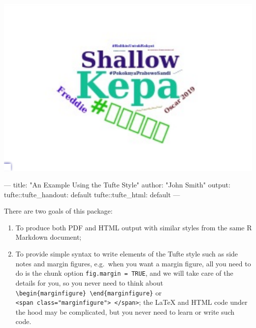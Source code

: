 \documentclass[]{tufte-handout}
\newenvironment{Shaded}{}{}
\newcommand{\StringTok}[1]{\textcolor[rgb]{0.25,0.44,0.63}{#1}}
\newcommand{\OtherTok}[1]{\textcolor[rgb]{0.00,0.44,0.13}{#1}}
\newcommand{\FunctionTok}[1]{\textcolor[rgb]{0.02,0.16,0.49}{#1}}
\newcommand{\AttributeTok}[1]{\textcolor[rgb]{0.49,0.56,0.16}{#1}}
\providecommand{\tightlist}{%
  \setlength{\itemsep}{0pt}\setlength{\parskip}{0pt}}
\begin{document}
\includegraphics{handout-twitter-analysis_files/figure-latex/unnamed-chunk-5-1}

\begin{Shaded}
\begin{Highlighting}[]
\OtherTok{---}
\FunctionTok{title:}\AttributeTok{ }\StringTok{"An Example Using the Tufte Style"}
\FunctionTok{author:}\AttributeTok{ }\StringTok{"John Smith"}
\FunctionTok{output:}
  \FunctionTok{tufte:}\AttributeTok{:tufte_handout: default}
  \FunctionTok{tufte:}\AttributeTok{:tufte_html: default}
\OtherTok{---}
\end{Highlighting}
\end{Shaded}

There are two goals of this package:

\begin{enumerate}
\def\labelenumi{\arabic{enumi}.}
\tightlist
\item
  To produce both PDF and HTML output with similar styles from the same
  R Markdown document;
\item
  To provide simple syntax to write elements of the Tufte style such as
  side notes and margin figures, e.g.~when you want a margin figure, all
  you need to do is the chunk option \texttt{fig.margin\ =\ TRUE}, and
  we will take care of the details for you, so you never need to think
  about
  \texttt{\textbackslash{}begin\{marginfigure\}\ \textbackslash{}end\{marginfigure\}}
  or
  \texttt{\textless{}span\ class="marginfigure"\textgreater{}\ \textless{}/span\textgreater{}};
  the LaTeX and HTML code under the hood may be complicated, but you
  never need to learn or write such code.
\end{enumerate}
\end{document}
